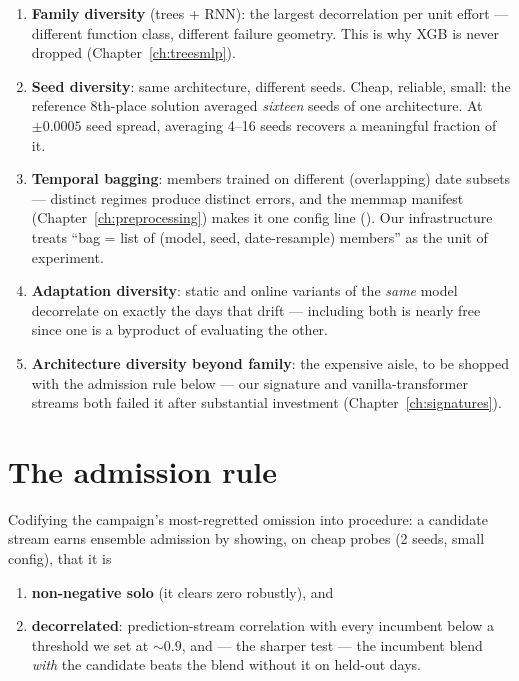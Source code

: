 \begin{enumerate}
\item \textbf{Family diversity} (trees + RNN): the largest decorrelation
  per unit effort --- different function class, different failure
  geometry. This is why XGB is never dropped
  (Chapter~\ref{ch:treesmlp}).
\item \textbf{Seed diversity}: same architecture, different seeds. Cheap,
  reliable, small: the reference 8th-place solution averaged
  \emph{sixteen} seeds of one architecture. At $\pm 0.0005$ seed spread,
  averaging 4--16 seeds recovers a meaningful fraction of it.
\item \textbf{Temporal bagging}: members trained on different
  (overlapping) date subsets --- distinct regimes produce distinct
  errors, and the memmap manifest
  (Chapter~\ref{ch:preprocessing}) makes it one config line
  (). Our infrastructure treats
  ``bag = list of (model, seed, date-resample) members'' as the unit of
  experiment.
\item \textbf{Adaptation diversity}: static and online variants of the
  \emph{same} model decorrelate on exactly the days that drift ---
  including both is nearly free since one is a byproduct of evaluating
  the other.
\item \textbf{Architecture diversity beyond family}: the expensive
  aisle, to be shopped with the admission rule below --- our signature
  and vanilla-transformer streams both failed it after substantial
  investment (Chapter~\ref{ch:signatures}).
\end{enumerate}

\section{The admission rule}

Codifying the campaign's most-regretted omission into procedure: a
candidate stream earns ensemble admission by showing, on cheap probes
(2 seeds, small config), that it is

\begin{enumerate}
\item \textbf{non-negative solo} (it clears zero robustly), and
\item \textbf{decorrelated}: prediction-stream correlation with every
  incumbent below a threshold we set at $\sim 0.9$, and --- the sharper
  test --- the incumbent blend \emph{with} the candidate beats the blend
  without it on held-out days.
\end{enumerate}


